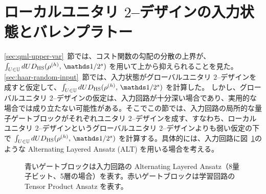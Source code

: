 \section{ローカルユニタリ $2$--デザインの入力状態とバレンプラトー}\label{sec:qml-var-local-2-design}
\ref{sec:qml-upper-var}~節では、コスト関数の勾配の分散の上界が、$\int_{U\in\bbU}dU D_{\HS} (\rho^{(h)} ,\, \bbid/2^s )$ を用いて上から抑えられることを見た。\ref{sec:haar-random-input}~節では、入力状態がグローバルユニタリ $2$--デザインを成すと仮定して、$\int_{U\in\bbU}dU D_{\HS} (\rho^{(h)} ,\, \bbid/2^s )$ を計算した。
しかし、グローバルユニタリ $2$--デザインの仮定は、入力回路が十分深い場合であり、実用的な場合では成り立たない可能性がある。そこでこの節では、入力回路の局所的な量子ゲートブロックがそれぞれユニタリ $2$--デザインを成す、すなわち、ローカルユニタリ $2$--デザインというグローバルユニタリ $2$--デザインよりも弱い仮定の下で $\int_{U\in\bbU}dU D_{\HS} (\rho^{(h)} ,\, \bbid/2^s )$ を計算する。具体的には、入力回路に図~\ref{fig:alt-tpa-structure}のような Alternating Layered Ansatz (ALT) を用いる場合を考える。


\newcommand{\bgbs}[1]{\gate[wires=2,style={fill=cyan!50}][1cm][0.1cm]{}\slice{#1}}
\newcommand{\bgb}{\gate[wires=2,style={fill=cyan!50}][1cm][0.1cm]{}}
\newcommand{\agb}{\gate[wires=1,style={fill=red!30}][1cm][0.5cm]{}}
\begin{figure}[H]
    \centering
    \caption{青いゲートブロックは入力回路の Alternating Layered Ansatz（8量子ビット、5層の場合）を表す。赤いゲートブロックは学習回路の Tensor Product Ansatz を表す。}
    \label{fig:alt-tpa-structure}
\end{figure}


